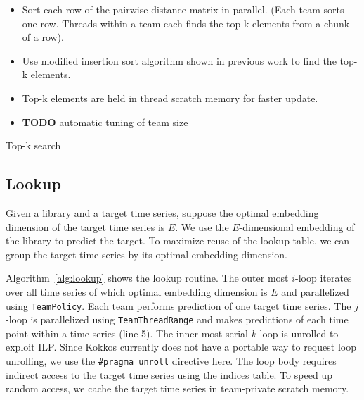 \documentclass[conference]{IEEEtran}
\begin{document}
\begin{itemize}
\item Sort each row of the pairwise distance matrix in parallel. (Each team sorts one row. Threads within a team each finds the top-k elements from a chunk of a row).
\item Use modified insertion sort algorithm shown in previous work to find the top-k elements.
\item Top-k elements are held in thread scratch memory for faster update.
\item \textbf{TODO} automatic tuning of team size
\end{itemize}

\begin{algorithm}
    \SetAlgoLined
    \DontPrintSemicolon
    \caption{Top-k search}%
    \label{alg:sort}
\end{algorithm}

\subsection{Lookup}

Given a library and a target time series, suppose the optimal embedding
dimension of the target time series is $E$. We use the $E$-dimensional embedding
of the library to predict the target. To maximize reuse of the lookup table, we
can group the target time series by its optimal embedding dimension.

Algorithm~\ref{alg:lookup} shows the lookup routine. The outer most $i$-loop
iterates over all time series of which optimal embedding dimension is $E$ and
parallelized using \texttt{TeamPolicy}. Each team performs prediction of one
target time series. The $j$-loop is parallelized using \texttt{TeamThreadRange}
and makes predictions of each time point within a time series (line 5). The
inner most serial $k$-loop is unrolled to exploit ILP\@. Since Kokkos currently
does not have a portable way to request loop unrolling, we use the
\texttt{\#pragma unroll} directive here. The loop body requires indirect access
to the target time series using the indices table. To speed up random access, we
cache the target time series in team-private scratch memory.
\end{document}
